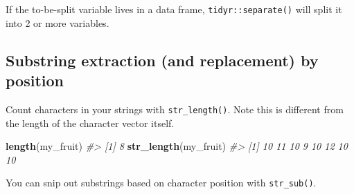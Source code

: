 \documentclass[
]{book}
\newenvironment{Shaded}{\begin{snugshade}}{\end{snugshade}}
\newcommand{\CommentTok}[1]{\textcolor[rgb]{0.56,0.35,0.01}{\textit{#1}}}
\newcommand{\DataTypeTok}[1]{\textcolor[rgb]{0.13,0.29,0.53}{#1}}
\newcommand{\DecValTok}[1]{\textcolor[rgb]{0.00,0.00,0.81}{#1}}
\newcommand{\KeywordTok}[1]{\textcolor[rgb]{0.13,0.29,0.53}{\textbf{#1}}}
\newcommand{\NormalTok}[1]{#1}
\newcommand{\OperatorTok}[1]{\textcolor[rgb]{0.81,0.36,0.00}{\textbf{#1}}}
\newcommand{\StringTok}[1]{\textcolor[rgb]{0.31,0.60,0.02}{#1}}
\begin{document}
If the to-be-split variable lives in a data frame, \texttt{tidyr::separate()} will split it into 2 or more variables.

\begin{Shaded}
\end{Shaded}

\hypertarget{substring-extraction-and-replacement-by-position}{%
\subsection{Substring extraction (and replacement) by position}\label{substring-extraction-and-replacement-by-position}}

Count characters in your strings with \texttt{str\_length()}. Note this is different from the length of the character vector itself.

\begin{Shaded}
\begin{Highlighting}[]
\KeywordTok{length}\NormalTok{(my_fruit)}
\CommentTok{#> [1] 8}
\KeywordTok{str_length}\NormalTok{(my_fruit)}
\CommentTok{#> [1] 10 11 10  9 10 12 10 10}
\end{Highlighting}
\end{Shaded}

You can snip out substrings based on character position with \texttt{str\_sub()}.

\begin{Shaded}
\end{Shaded}
\end{document}
